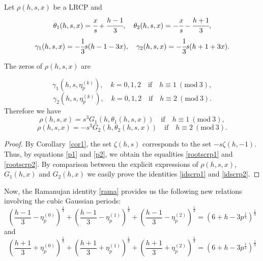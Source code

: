 \documentclass[12pt,reqno]{article}
\begin{document}
\begin{theorem}
Let $\rho(h,s,x)$ be a LRCP and 
$$\theta_1(h,s,x)=\cfrac{x}{s}+\cfrac{h-1}{3},\quad \theta_2(h,s,x)=-\cfrac{x}{s}-\cfrac{h+1}{3},$$
$$ \gamma_1(h,s,x)=-\cfrac{1}{3}s(h-1-3x),\quad \gamma_2(h,s,x)=-\cfrac{1}{3}s(h+1+3x). $$

The zeros of $\rho(h,s,x)$ are

\begin{equation}\label{rootscrp1}
\gamma_1(h,s,\eta_p^{(k)}),\quad k=0,1,2 \quad \text{if} \quad h\equiv 1 \ (\text{mod} \ 3),\end{equation}
\begin{equation}\label{rootscrp2}
\gamma_2(h,s,\eta_p^{(k)}),\quad k=0,1,2 \quad \text{if} \quad h\equiv 2 \ (\text{mod}\ 3).\end{equation}
Therefore we have
\begin{equation}\label{idscrp1}
\rho(h,s,x)=s^3G_1(h,\theta_1(h,s,x))\quad\text{if} \quad h\equiv 1 \ (\text{mod}\ 3),\end{equation}
\begin{equation}\label{idscrp2}
\rho(h,s,x)=-s^3G_2(h,\theta_2(h,s,x))\quad\text{if} \quad h\equiv 2 \ (\text{mod}\ 3).\end{equation}
\end{theorem}
\begin{proof}
By Corollary~\ref{cor1}, the set $\zeta(h,s)$ corresponds to the set $-s\zeta(h,-1)$. Thus, by equations \eqref{p1} and \eqref{p2}, we obtain the equalities \eqref{rootscrp1} and \eqref{rootscrp2}. 
By comparison between the explicit expressions of $\rho(h,s,x)$, $G_1(h,x)$ and $G_2(h,x)$ we easily prove the identities \eqref{idscrp1} and \eqref{idscrp2}.
\end{proof}
Now, the Ramanujan identity \eqref{rama} provides us the following new relations involving the cubic Gaussian periods:
\small
\begin{equation} \label{gaussrama}
\left(\frac{h-1}{3}-\eta_p^{(0)}\right)^{\frac{1}{3}}+\left(\frac{h-1}{3}-\eta_p^{(1)}\right)^{\frac{1}{3}}+\left(\frac{h-1}{3}-\eta_p^{(2)}\right)^{\frac{1}{3}}=\left(6+h-3p^{\frac{1}{3}}\right)^{\frac{1}{3}}
\end{equation}
\normalsize
and
\small
\begin{equation} \label{gaussrama2}
\left(\frac{h+1}{3}+\eta_p^{(0)}\right)^{\frac{1}{3}}+\left(\frac{h+1}{3}+\eta_p^{(1)}\right)^{\frac{1}{3}}+\left(\frac{h+1}{3}+\eta_p^{(2)}\right)^{\frac{1}{3}}=\left(6+h-3p^{\frac{1}{3}}\right)^{\frac{1}{3}}
\end{equation}
\end{document}
